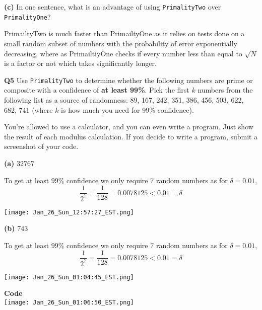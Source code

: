 \documentclass[12pt]{article}
\newcommand{\question}[3][Q]{
\begin{description}
\item \textbf{#1{#2}} #3
\end{description}
}
\begin{document}
\question[]{(c)}{
    In one sentence, what is an advantage of using \texttt{PrimalityTwo} over \texttt{PrimalityOne}?
}

\begin{answer}
    PrimailtyTwo is much faster than PrimailtyOne as it relies on tests done on a small random subset of numbers with the probability of error exponentially decreasing, where as PrimailtiyOne checks if every number less than equal to $\sqrt{N}$ is a factor or not which takes significantly longer.
\end{answer}

\newpage
\question{5}{
    Use \texttt{PrimalityTwo} to determine whether the following numbers are prime or composite with a confidence of \textbf{at least 99\%}. Pick the first $k$ numbers from the following list as a source of randomness: 89, 167, 242, 351, 386, 456, 503, 622, 682, 741 (where $k$ is how much you need for 99\% confidence). 

    You're allowed to use a calculator, and you can even write a program. Just show the result of each modulus calculation. If you decide to write a program, submit a screenshot of your code. 
}
\question[]{(a)}{
    32767 
}
\begin{answer}
    To get at least $99\%$ confidence we only require $7$ random numbers as for $\delta = 0.01$, 
    $$ \frac{1}{2^{7}} = \frac{1}{128} = 0.0078125 < 0.01 = \delta $$ 
    \begin{center}
    \texttt{[image: Jan\_26\_Sun\_12:57:27\_EST.png]}
    \end{center}
\end{answer}

\question[]{(b)}{
    743
}
\begin{answer}
    To get at least $99\%$ confidence we only require $7$ random numbers as for $\delta = 0.01$, 
    $$ \frac{1}{2^{7}} = \frac{1}{128} = 0.0078125 < 0.01 = \delta $$ 
    \begin{center}
    \texttt{[image: Jan\_26\_Sun\_01:04:45\_EST.png]}
    \end{center}

\end{answer}
\newpage
\begin{center}
    \textbf{Code}\\
    \vspace{1em}
    \texttt{[image: Jan\_26\_Sun\_01:06:50\_EST.png]}
\end{center}
\end{document}
